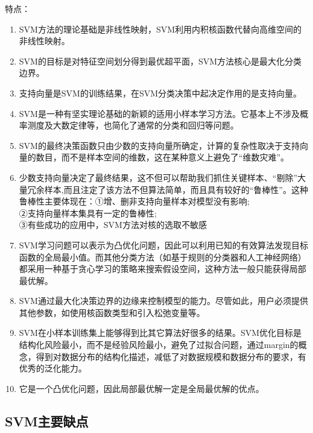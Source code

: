 特点：

\begin{enumerate}
\def\labelenumi{(\arabic{enumi})}
\item
  SVM方法的理论基础是非线性映射，SVM利用内积核函数代替向高维空间的非线性映射。\\
\item
  SVM的目标是对特征空间划分得到最优超平面，SVM方法核心是最大化分类边界。\\
\item
  支持向量是SVM的训练结果，在SVM分类决策中起决定作用的是支持向量。\\
\item
  SVM是一种有坚实理论基础的新颖的适用小样本学习方法。它基本上不涉及概率测度及大数定律等，也简化了通常的分类和回归等问题。
\item
  SVM的最终决策函数只由少数的支持向量所确定，计算的复杂性取决于支持向量的数目，而不是样本空间的维数，这在某种意义上避免了``维数灾难''。\\
\item
  少数支持向量决定了最终结果，这不但可以帮助我们抓住关键样本、``剔除''大量冗余样本,而且注定了该方法不但算法简单，而且具有较好的``鲁棒性''。这种鲁棒性主要体现在：
  ​ ①增、删非支持向量样本对模型没有影响;\\
  ​ ②支持向量样本集具有一定的鲁棒性;\\
  ​ ③有些成功的应用中，SVM方法对核的选取不敏感\\
\item
  SVM学习问题可以表示为凸优化问题，因此可以利用已知的有效算法发现目标函数的全局最小值。而其他分类方法（如基于规则的分类器和人工神经网络）都采用一种基于贪心学习的策略来搜索假设空间，这种方法一般只能获得局部最优解。\\
\item
  SVM通过最大化决策边界的边缘来控制模型的能力。尽管如此，用户必须提供其他参数，如使用核函数类型和引入松弛变量等。
\item
  SVM在小样本训练集上能够得到比其它算法好很多的结果。SVM优化目标是结构化风险最小，而不是经验风险最小，避免了过拟合问题，通过margin的概念，得到对数据分布的结构化描述，减低了对数据规模和数据分布的要求，有优秀的泛化能力。\\
\item
  它是一个凸优化问题，因此局部最优解一定是全局最优解的优点。
\end{enumerate}

\subsection{ SVM主要缺点}\label{svmux4e3bux8981ux7f3aux70b9}

